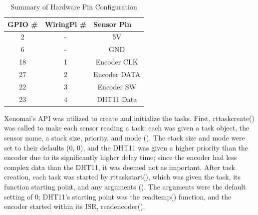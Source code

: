 \documentclass[letterpaper, 12pt]{article}
\begin{document}
\begin{table}[hbt]
	\centering
	\caption{Summary of Hardware Pin Configuration}
	\label{my-label}
	\begin{tabular}{|c|c|c|}
		\hline
		\multicolumn{1}{|l|}{GPIO \#} & \multicolumn{1}{l|}{WiringPi \#} & \multicolumn{1}{l|}{Sensor Pin} \\ \hline
		2                             & -                                & 5V                              \\ \hline
		6                             & -                                & GND                             \\ \hline
		18                            & 1                                & Encoder CLK                     \\ \hline
		27                            & 2                                & Encoder DATA                    \\ \hline
		22                            & 3                                & Encoder SW                      \\ \hline
		23                            & 4                                & DHT11 Data                      \\ \hline
	\end{tabular}
\end{table}

\indent Xenomai's API was utilized to create and initialize the tasks.  First, rt\textunderscore task\textunderscore create() was called to make each sensor reading a task: each was given a task object, the sensor name, a stack size, priority, and mode (\cite{xenomai2018}).  The stack size and mode were set to their defaults (0, 0), and the DHT11 was given a higher priority than the encoder due to its significantly higher delay time; since the encoder had less complex data than the DHT11, it was deemed not as important.  After task creation, each task was started by rt\textunderscore task\textunderscore start(), which was given the task, its function starting point, and any arguments (\cite{xenomai2018}).  The arguments were the default setting of 0; DHT11's starting point was the read\textunderscore temp() function, and the encoder started within its ISR, read\textunderscore encoder().
\end{document}
